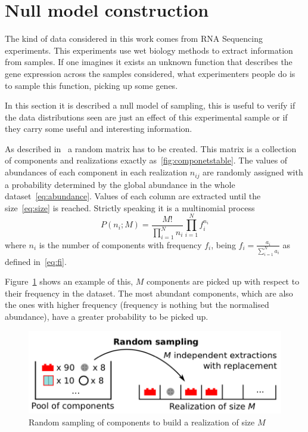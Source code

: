 \section{Null model construction}\label{sec:nullmodel}
The kind of data considered in this work comes from RNA Sequencing experiments. This experiments use wet biology methods to extract information from samples. If one imagines it exists an unknown function that describes the gene expression across the samples considered, what experimenters people do is to sample  this function, picking up some genes.

In this section it is described a null model of sampling, this is useful to verify if the data distributions seen are just an effect of this experimental sample or if they carry some useful and interesting information.

As described in~\cite{Mazzolini2018} a random matrix has to be created. This matrix is a collection of components and realizations exactly as~\ref{fig:componetstable}. The values of abundances of each component in each realization $n_{i j}$ are randomly assigned with a probability determined by 
the global abundance in the whole dataset~\ref{eq:abundance}. Values of each column are extracted until the size~\ref{eq:size} is 
reached. Strictly speaking it is a multinomial process
\begin{equation}
P\left({n_i};M\right)=\frac{M!}{\prod_{i=1}^{N} n_i}\prod_{i=1}^N f_i^{n_i}
\end{equation}
where $n_i$ is the number of components with frequency $f_i$, being $f_i=\frac{a_i}{\sum_{i=1}^{N}a_{i}}$ as defined in~\ref{eq:fi}.

Figure~\ref{fig:structure/randomsampling} shows an example of this, $M$ components are picked up with respect to their frequency in the dataset. The most abundant components, which are also the ones with higher frequency (frequency is nothing but the normalised abundance), have a greater probability to be picked up.
\begin{figure}[htb!]
    \centering
    \includegraphics[width=0.8\linewidth]{pictures/structure/randomsampling.png}
    \caption{Random sampling of components to build a realization of size $M$}
    \label{fig:structure/randomsampling}
\end{figure}

